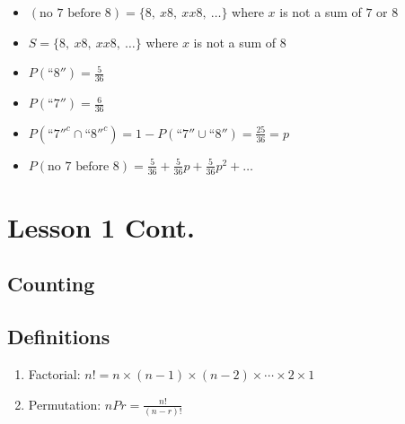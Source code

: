 \documentclass[12pt]{article}
\begin{document}
\begin{itemize}
\begin{itemize}
                \item $(\text{no } 7 \text{ before } 8) = \{8,\ x8,\ xx8,\ \dots\}$ where $x$ is not a sum of $7$ or $8$
                \item $S = \{8,\ x8,\ xx8,\ \dots\}$ where $x$ is not a sum of $8$
                \item $P(\text{``}8{''}) = \frac{5}{36}$
                \item $P(\text{``}7{''}) = \frac{6}{36}$
                \item $P(\text{``}7{''}^c \cap \text{``}8{''}^c) = 1 - P(\text{``}7{''} \cup \text{``}8{''}) = \frac{25}{36} = p$
                \item $P(\text{no } 7 \text{ before } 8) = \frac{5}{36} + \frac{5}{36}p + \frac{5}{36}p^2 + \dots$
            \end{itemize}
        \end{itemize}
        \section{Lesson 1 Cont.}
            \subsection{Counting}
                \subsection{Definitions}
                    \begin{enumerate}
                        \item Factorial: $n! = n \times (n - 1) \times (n - 2) \times \cdots \times 2 \times 1$
                        \item Permutation: $nPr = \frac{n!}{(n - r)!}$
                    \end{enumerate}
\end{document}
